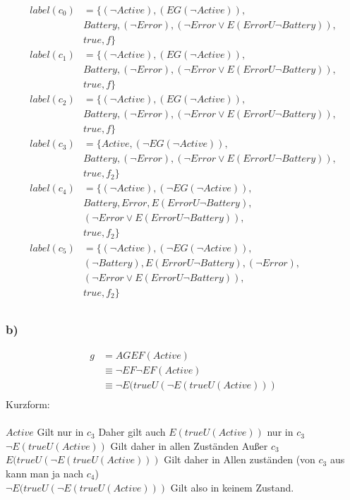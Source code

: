 \begin{align*}
label(c_0)&=\{(\neg Active),(EG(\neg Active)),\\
&Battery,(\neg Error),(\neg Error \vee E(Error U \neg Battery)),\\
&true,f\}\\
label(c_1)&=\{(\neg Active),(EG(\neg Active)),\\
&Battery,(\neg Error),(\neg Error \vee E(Error U \neg Battery)),\\
&true,f\}\\
label(c_2)&=\{(\neg Active),(EG(\neg Active)),\\
&Battery,(\neg Error),(\neg Error \vee E(Error U \neg Battery)),\\
&true,f\}\\
label(c_3)&=\{Active,(\neg EG(\neg Active)),\\
&Battery,(\neg Error),(\neg Error \vee E(Error U \neg Battery)),\\
&true,f_2\}\\
label(c_4)&=\{(\neg Active),(\neg EG(\neg Active)),\\
&Battery,Error,E(Error U \neg Battery),\\
&(\neg Error \vee E(Error U \neg Battery)),\\
&true,f_2\}\\
label(c_5)&=\{(\neg Active),(\neg EG(\neg Active)),\\
&(\neg Battery),E(Error U \neg Battery),(\neg Error),\\
&(\neg Error \vee E(Error U \neg Battery)),\\
&true,f_2\}\\
\end{align*}

\subsubsection*{b)}
\begin{align*}
g&=	AGEF(Active)\\
&\equiv\neg EF \neg EF (Active)\\
&\equiv\neg E(true U (\neg E(trueU (Active)))\\
\end{align*}
Kurzform:\\
\\

$Active$ Gilt nur in $c_3$ Daher gilt auch $E(trueU (Active))$ nur in $c_3$\\
$\neg E(trueU (Active))$ Gilt daher in allen Zuständen Außer $c_3$\\
$E(true U (\neg E(trueU (Active)))$ Gilt daher in Allen zuständen (von $c_3$ aus kann man ja nach $c_4$)\\
$\neg E(true U (\neg E(trueU (Active)))$ Gilt also in keinem Zustand.




